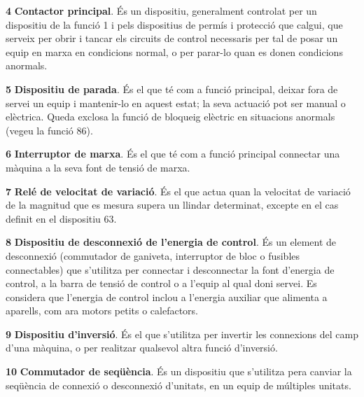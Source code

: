 \begin{multicols}{2}
\begin{list}{}
\item[\textbf{4}]  
 \textbf{Contactor principal}. És un dispositiu,
generalment controlat per un dispositiu de la funció 1 i pels dispositius de permís i protecció
que calgui, que serveix per obrir i tancar els circuits de control necessaris per tal de
posar un equip en marxa en condicions normal, o per parar-lo  quan es donen condicions anormals.

\item[\textbf{5}]    
 \textbf{Dispositiu de parada}. És el que
té com a funció principal, deixar fora de servei un equip i
mantenir-lo en aquest estat; la seva actuació pot ser manual o
elèctrica. Queda exclosa la funció de bloqueig elèctric en
situacions anormals (vegeu la funció 86).

\item[\textbf{6}]  
\textbf{Interruptor de marxa}. És
el que té com a funció principal connectar una màquina a la seva font de tensió de marxa.

\item[\textbf{7}]    
\textbf{Relé de velocitat de variació}. És el que
actua quan la velocitat de variació de la magnitud que es mesura supera un llindar determinat, excepte en el cas definit en el dispositiu 63.

\item[\textbf{8}]   
\textbf{Dispositiu de desconnexió de l'energia
de control}. És un element de desconnexió (commutador de ganiveta,
interruptor de bloc o fusibles connectables) que s'utilitza per
connectar i desconnectar la font d'energia de control,  a la barra
de tensió de control o a l'equip al qual doni servei. Es considera
que l'energia de control inclou a l'energia auxiliar que alimenta a
aparells, com ara motors petits o calefactors.

\item[\textbf{9}]   
\textbf{Dispositiu d'inversió}. És el
que s'utilitza per invertir les connexions del camp d'una màquina, o
per realitzar qualsevol altra funció  d'inversió.

\item[\textbf{10}]   
\textbf{Commutador de seqüència}. És un
dispositiu que s'utilitza pera canviar la seqüència de connexió o
desconnexió d'unitats, en un equip de múltiples unitats.



\end{list}
\end{multicols}
